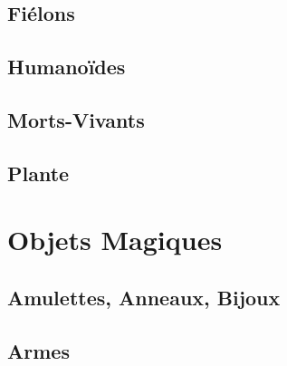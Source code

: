 \documentclass{dd}
\begin{document}
\section{Fiélons}


%

%


%
%



\section{Humanoïdes}











\section{Morts-Vivants}









\section{Plante}


\chapter{Objets Magiques}

\section{Amulettes, Anneaux, Bijoux} \label{OMbijoux}

%
%

\section{Armes} \label{OMarmes}
\end{document}
